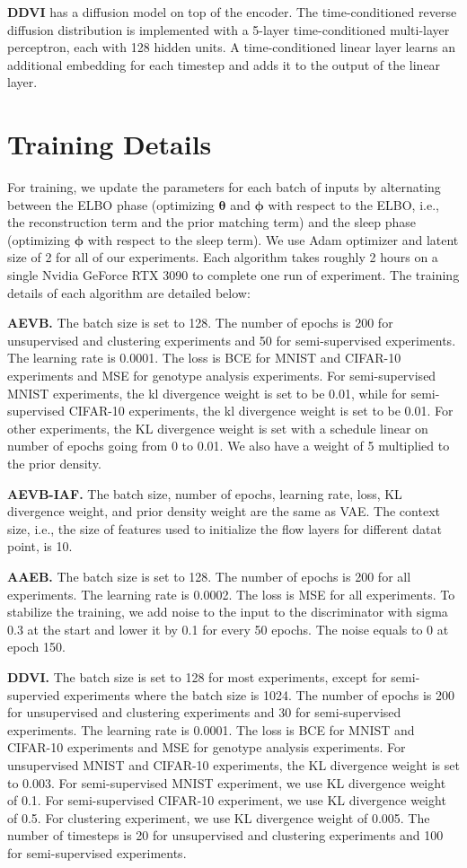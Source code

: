 \documentclass[letterpaper]{article} %
\let\oldtheta\theta
\renewcommand{\theta}{{\boldsymbol \oldtheta}}
\let\oldphi\phi
\renewcommand{\phi}{{\boldsymbol \oldphi}}
\begin{document}
\textbf{DDVI} has a diffusion model on top of the encoder. The time-conditioned reverse diffusion distribution is implemented with a 5-layer time-conditioned multi-layer perceptron, each with 128 hidden units. A time-conditioned linear layer learns an additional embedding for each timestep and adds it to the output of the linear layer.

\section{Training Details} 
\label{app:training_details}

For training, we update the parameters for each batch of inputs by alternating between the ELBO phase (optimizing $\theta$ and $\phi$ with respect to the ELBO, i.e., the reconstruction term and the prior matching term) and the sleep phase (optimizing $\phi$ with respect to the sleep term). We use Adam optimizer and latent size of 2 for all of our experiments. Each algorithm takes roughly 2 hours on a single Nvidia GeForce RTX 3090 to complete one run of experiment. The training details of each algorithm are detailed below:

\textbf{AEVB.} The batch size is set to 128. The number of epochs is 200 for unsupervised and clustering experiments and 50 for semi-supervised experiments. The learning rate is 0.0001. The loss is BCE for MNIST and CIFAR-10 experiments and MSE for genotype analysis experiments. For semi-supervised MNIST experiments, the kl divergence weight is set to be 0.01, while for semi-supervised CIFAR-10 experiments, the kl divergence weight is set to be 0.01. For other experiments, the KL divergence weight is set with a schedule linear on number of epochs going from 0 to 0.01. We also have a weight of 5 multiplied to the prior density.

\textbf{AEVB-IAF.} The batch size, number of epochs, learning rate, loss, KL divergence weight, and prior density weight are the same as VAE. The context size, i.e., the size of features used to initialize the flow layers for different datat point, is 10. 

\textbf{AAEB.} The batch size is set to 128. The number of epochs is 200 for all experiments. The learning rate is 0.0002. The loss is MSE for all experiments. To stabilize the training, we add noise to the input to the discriminator with sigma 0.3 at the start and lower it by 0.1 for every 50 epochs. The noise equals to 0 at epoch 150.

\textbf{DDVI.} The batch size is set to 128 for most experiments, except for semi-supervied experiments where the batch size is 1024. The number of epochs is 200 for unsupervised and clustering experiments and 30 for semi-supervised experiments. The learning rate is 0.0001. The loss is BCE for MNIST and CIFAR-10 experiments and MSE for genotype analysis experiments. For unsupervised MNIST and CIFAR-10 experiments, the KL divergence weight is set to 0.003. For semi-supervised MNIST experiment, we use KL divergence weight of 0.1. For semi-supervised CIFAR-10 experiment, we use KL divergence weight of 0.5. For clustering experiment, we use KL divergence weight of 0.005. The number of timesteps is 20 for unsupervised and clustering experiments and 100 for semi-supervised experiments.
\end{document}

